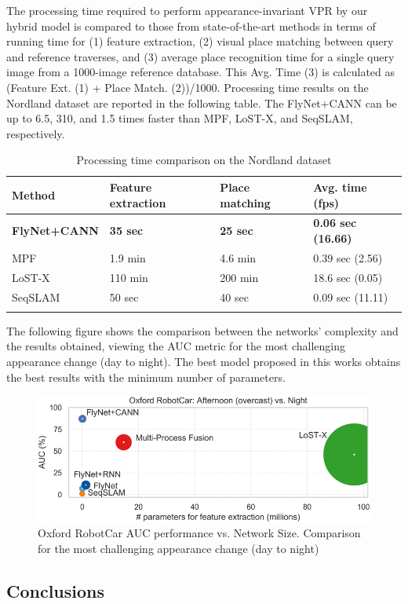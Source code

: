 The processing time required to perform appearance-invariant VPR by our
hybrid model is compared to those from state-of-the-art methods in terms
of running time for (1) feature extraction, (2) visual place matching
between query and reference traverses, and (3) average place recognition
time for a single query image from a 1000-image reference database. This
Avg. Time (3) is calculated as (Feature Ext. (1) + Place Match.
(2))/1000. Processing time results on the Nordland dataset are reported
in the following table. The FlyNet+CANN can be up to 6.5, 310, and 1.5
times faster than MPF, LoST-X, and SeqSLAM, respectively.

\begin{longtable}[]{@{}llll@{}}
\toprule
\textbf{Method} & \textbf{Feature extraction} & \textbf{Place matching}
& \textbf{Avg. time (fps)}\tabularnewline
\midrule
\endhead
\textbf{FlyNet+CANN} & \textbf{35 sec} & \textbf{25 sec} & \textbf{0.06
sec (16.66)}\tabularnewline
MPF & 1.9 min & 4.6 min & 0.39 sec (2.56)\tabularnewline
LoST-X & 110 min & 200 min & 18.6 sec (0.05)\tabularnewline
SeqSLAM & 50 sec & 40 sec & 0.09 sec (11.11)\tabularnewline
\bottomrule
\caption{Processing time comparison on the Nordland dataset}
\end{longtable}

The following figure shows the comparison between the networks'
complexity and the results obtained, viewing the AUC metric for the most
challenging appearance change (day to night). The best model proposed in
this works obtains the best results with the minimum number of
parameters.

\begin{figure}[h!]
\centering
\includegraphics[width=1\linewidth]{images/flynetothermodeldimensions.png}
\caption{Oxford RobotCar AUC performance vs. Network Size. Comparison for the most challenging appearance change (day to night)}
\end{figure}

\subsection{Conclusions}\label{header-n256}

